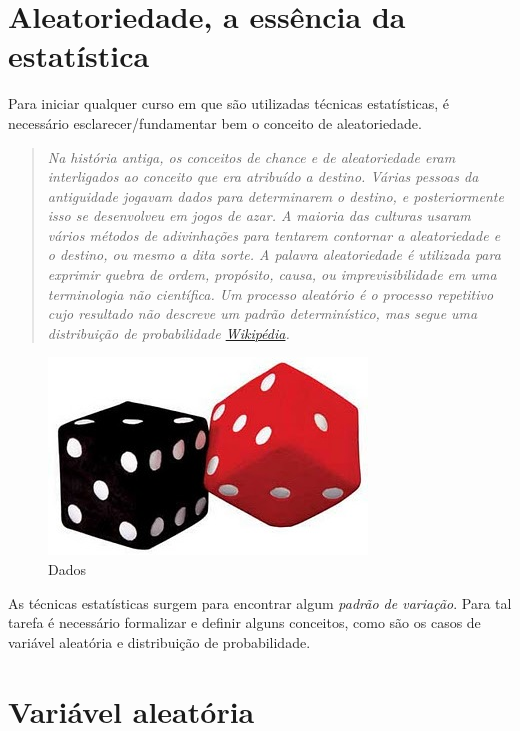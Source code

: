 \documentclass[
]{book}
\theoremstyle{definition}
\theoremstyle{definition}
\theoremstyle{definition}
\theoremstyle{remark}
\begin{document}
\hypertarget{aleatoriedade-a-essuxeancia-da-estatuxedstica}{%
\section{Aleatoriedade, a essência da estatística}\label{aleatoriedade-a-essuxeancia-da-estatuxedstica}}

Para iniciar qualquer curso em que são utilizadas técnicas estatísticas, é necessário
esclarecer/fundamentar bem o conceito de aleatoriedade.

\begin{quote}
\emph{Na história antiga, os conceitos de chance e de aleatoriedade eram interligados ao conceito que era atribuído a destino. Várias pessoas da antiguidade jogavam dados para determinarem o destino, e posteriormente isso se desenvolveu em jogos de azar. A maioria das culturas usaram vários métodos de adivinhações para tentarem contornar a aleatoriedade e o destino, ou mesmo a dita sorte. A palavra aleatoriedade é utilizada para exprimir quebra de ordem, propósito, causa, ou imprevisibilidade em uma terminologia não científica. Um processo aleatório é o processo repetitivo cujo resultado não descreve um padrão determinístico, mas segue uma distribuição de probabilidade \href{https://pt.wikipedia.org/wiki/Aleatoriedade}{Wikipédia}.}
\end{quote}

\begin{figure}

{\centering \includegraphics[width=0.33\linewidth]{Figuras/dados-vp} 

}

\caption{Dados}\label{fig:dados}
\end{figure}

As técnicas estatísticas surgem para encontrar algum \emph{padrão de variação}. Para tal tarefa é necessário formalizar e definir alguns conceitos, como são os casos de variável aleatória e distribuição de probabilidade.

\hypertarget{variuxe1vel-aleatuxf3ria}{%
\section{Variável aleatória}\label{variuxe1vel-aleatuxf3ria}}
\end{document}
